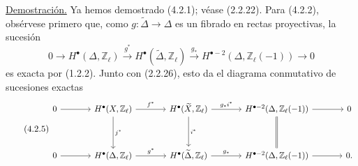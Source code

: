 \noindent\underline{Demostración.}
Ya hemos demostrado (4.2.1); véase (2.2.22). Para (4.2.2), obsérvese
primero que, como $g:\widetilde\Delta\to\Delta$ es un fibrado en rectas
proyectivas, la sucesión
\begin{equation}\tag{4.2.4}
0\longrightarrow H^\bullet(\Delta,\mathbb Z_\ell)
\xrightarrow{g^*}H^\bullet(\widetilde\Delta,\mathbb Z_\ell)
\xrightarrow{g_*}H^{\bullet-2}(\Delta,\mathbb Z_\ell(-1))
\longrightarrow0
\end{equation}
es exacta por (1.2.2). Junto con (2.2.26), esto da el diagrama
conmutativo de sucesiones exactas
\begin{equation}\tag{4.2.5}
\resizebox{\textwidth}{!}{%
\begin{tikzcd}[ampersand replacement=\&,column sep=large,row sep=huge]
0\arrow[r]
  \&H^\bullet(X,\mathbb Z_\ell)
       \arrow[r,"f^*"]\arrow[d,"j^*" right]
  \&H^\bullet(\widetilde X,\mathbb Z_\ell)
       \arrow[r,"g_*i^*"]\arrow[d,"i^*" right]
  \&H^{\bullet-2}(\Delta,\mathbb Z_\ell(-1))
       \arrow[r]\arrow[d,equal]
  \&0\\
0\arrow[r]
  \&H^\bullet(\Delta,\mathbb Z_\ell)
       \arrow[r,"g^*"]
  \&H^\bullet(\widetilde\Delta,\mathbb Z_\ell)
       \arrow[r,"g_*"]
  \&H^{\bullet-2}(\Delta,\mathbb Z_\ell(-1))
       \arrow[r]
  \&0.
\end{tikzcd}}
\end{equation}

\pageoriginale

